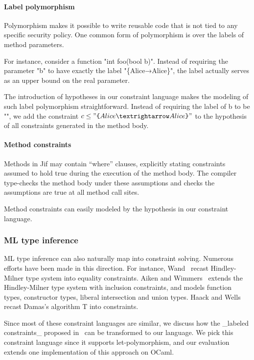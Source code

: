\paragraph{Label polymorphism}

Polymorphism makes it possible to write reusable code that is not tied
to any specific security policy. One common form of polymorphism is
over the labels of method parameters. 

For instance, consider a function "int foo(bool b)".
Instead of requiring the parameter "b" to have exactly the label
"\{Alice→Alice\}", the label actually serves as an upper bound on the
real parameter.

The introduction of hypotheses in our constraint language makes the
modeling of such label polymorphism straightforward. Instead of
requiring the label of b to
be "", we add the constraint $c\leq
"\lab{Alice→Alice}"$ to the hypothesis of all constraints generated in the
method body.

\paragraph{Method constraints}

Methods in Jif may contain ``where'' clauses, explicitly stating
constraints assumed to hold true during the execution of the method
body. The compiler type-checks the method body under these assumptions
and checks the assumptions are true at all method call sites. 

Method constraints can easily modeled by the hypothesis in our
constraint language.
 
\subsubsection{ML type inference}

ML type inference can also naturally map into constraint solving. Numerous 
efforts have been made in this direction. For instance,
Wand~\cite{wand-typeinference} recast Hindley-Milner type system into equality
constraints. Aiken and Wimmers~\cite{aiken-typeinclusion} extends the
Hindley-Milner type system with inclusion constraints, and models function
types, constructor types, liberal intersection and union types. Haack and Wells
~\cite{haack:slicing} recast Damas’s algorithm T into constraints.

Since most of these constraint languages are similar, we discuss how
the _labeled constraints_ proposed in~\cite{haack:slicing} can be
transformed to our language. We pick this constraint language since it
supports let-polymorphism, and our evaluation extends one
implementation of this approach on OCaml.

